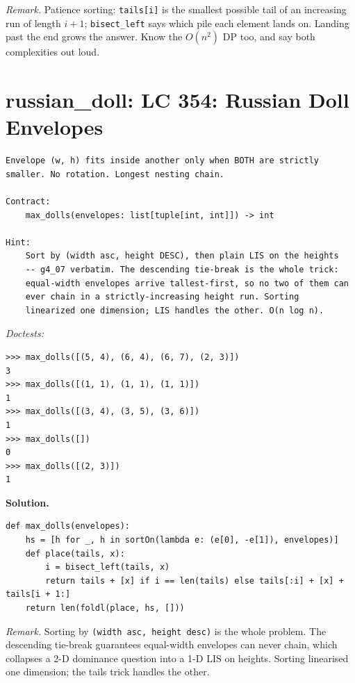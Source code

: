 \documentclass[11pt,letterpaper]{book}
\begin{document}
\noindent\textit{Remark.} Patience sorting: \texttt{tails[i]} is the smallest possible tail
of an increasing run of length $i{+}1$; \texttt{bisect\_left} says which pile
each element lands on. Landing past the end grows the answer. Know the
$O(n^2)$ DP too, and say both complexities out loud.

\section{russian\_doll: LC 354: Russian Doll Envelopes}
\begin{lstlisting}[style=spec]
Envelope (w, h) fits inside another only when BOTH are strictly
smaller. No rotation. Longest nesting chain.

Contract:
    max_dolls(envelopes: list[tuple[int, int]]) -> int

Hint:
    Sort by (width asc, height DESC), then plain LIS on the heights
    -- g4_07 verbatim. The descending tie-break is the whole trick:
    equal-width envelopes arrive tallest-first, so no two of them can
    ever chain in a strictly-increasing height run. Sorting
    linearized one dimension; LIS handles the other. O(n log n).
\end{lstlisting}
\noindent\textit{Doctests:}
\begin{lstlisting}[style=spec]
>>> max_dolls([(5, 4), (6, 4), (6, 7), (2, 3)])
3
>>> max_dolls([(1, 1), (1, 1), (1, 1)])
1
>>> max_dolls([(3, 4), (3, 5), (3, 6)])
1
>>> max_dolls([])
0
>>> max_dolls([(2, 3)])
1
\end{lstlisting}
\noindent\textbf{Solution.}
\begin{lstlisting}[style=code]
def max_dolls(envelopes):
    hs = [h for _, h in sortOn(lambda e: (e[0], -e[1]), envelopes)]
    def place(tails, x):
        i = bisect_left(tails, x)
        return tails + [x] if i == len(tails) else tails[:i] + [x] + tails[i + 1:]
    return len(foldl(place, hs, []))
\end{lstlisting}

\noindent\textit{Remark.} Sorting by \texttt{(width asc, height desc)} is the whole
problem. The descending tie-break guarantees equal-width envelopes can never
chain, which collapses a 2-D dominance question into a 1-D LIS on heights.
Sorting linearised one dimension; the tails trick handles the other.
\end{document}
